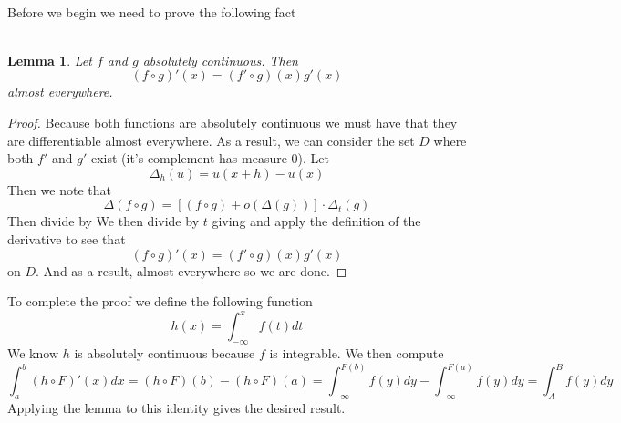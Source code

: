 \documentclass{article}
\newcommand{\problem}[1]{\noindent{\textbf{Problem #1}}\\}
\newcommand{\problempart}[1]{\noindent{\textbf{(#1)}}}
\newtheorem*{lem}{\\ Lemma}
\begin{document}
\problempart{c}

\problem{3.5.21}
\problempart{a}

\problempart{b} Before we begin we need to prove the following fact
\begin{lem}
Let $f$ and $g$ absolutely continuous. Then
\[
(f\circ g)'(x) = (f' \circ g)(x)g'(x)
\]
almost everywhere. 
\end{lem}
\begin{proof}
Because both functions are absolutely continuous we must have that they are differentiable almost everywhere. As a result, we can consider the set $D$ where both $f'$ and $g'$ exist (it's complement has measure 0). Let
\[
\Delta_h(u) = u(x+h) - u(x)
\]
Then we note that
\[
\Delta(f \circ g) = [(f \circ g) + o(\Delta(g))]\cdot \Delta_t(g)
\]
Then divide by We then divide by $t$ giving and apply the definition of the derivative to see that
\[
(f \circ g)'(x) = (f' \circ g)(x)g'(x)
\]
on $D$. And as a result, almost everywhere so we are done. 
\end{proof}
To complete the proof we define the following function
\[
h(x) = \int_{-\infty}^x f(t)dt 
\]
We know $h$ is absolutely continuous because $f$ is integrable. We then compute
\[
\int_a^b (h\circ F)'(x)dx = (h \circ F)(b) - (h\circ F)(a) = \int_{-\infty}^{F(b)} f(y)dy -\int_{-\infty}^{F(a)} f(y)dy = \int_{A}^{B} f(y)dy 
\]
Applying the lemma to this identity gives the desired result. 
\end{document}
